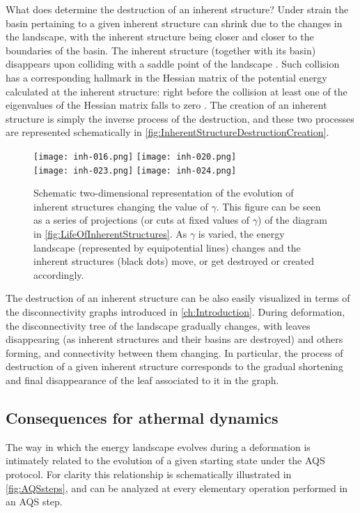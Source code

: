 What does determine the destruction of an inherent structure? Under strain the basin pertaining to a given inherent structure can shrink due to the changes in the landscape, with the inherent structure being closer and closer to the boundaries of the basin. The inherent structure (together with its basin) disappears upon colliding with a saddle point of the landscape \cite{malandro1999relationships}. Such collision has a corresponding hallmark in the Hessian matrix of the potential energy calculated at the inherent structure: right before the collision at least one of the eigenvalues of the Hessian matrix falls to zero \cite{malandro1999relationships}. The creation of an inherent structure is simply the inverse process of the destruction, and these two processes are represented schematically in \autoref{fig:InherentStructureDestructionCreation}.

\begin{figure}[!h] 
\centering 
\texttt{[image: inh-016.png]} 
\texttt{[image: inh-020.png]} \\
\texttt{[image: inh-023.png]} 
\texttt{[image: inh-024.png]} 
\caption{Schematic two-dimensional representation of the evolution of inherent structures changing the value of $\gamma$. This figure can be seen as a series of projections (or cuts at fixed values of $\gamma$) of the diagram in \autoref{fig:LifeOfInherentStructures}. As $\gamma$ is varied, the energy landscape (represented by equipotential lines) changes and the inherent structures (black dots) move, or get destroyed or created accordingly. \label{fig:InherentStructureDestructionCreation}}
\end{figure}

The destruction of an inherent structure can be also easily visualized in terms of the disconnectivity graphs introduced in \autoref{ch:Introduction}. During deformation, the disconnectivity tree of the landscape gradually changes, with leaves disappearing (as inherent structures and their basins are destroyed) and others forming, and connectivity between them changing.
In particular, the process of destruction of a given inherent structure corresponds to the gradual shortening and final disappearance of the leaf associated to it in the graph.

\subsection{Consequences for athermal dynamics \label{sec:AQSDynamics}}
The way in which the energy landscape evolves during a deformation is intimately related to the evolution of a given starting state under the AQS protocol. For clarity this relationship is schematically illustrated in \autoref{fig:AQSsteps}, and can be analyzed at every elementary operation performed in an AQS step.

